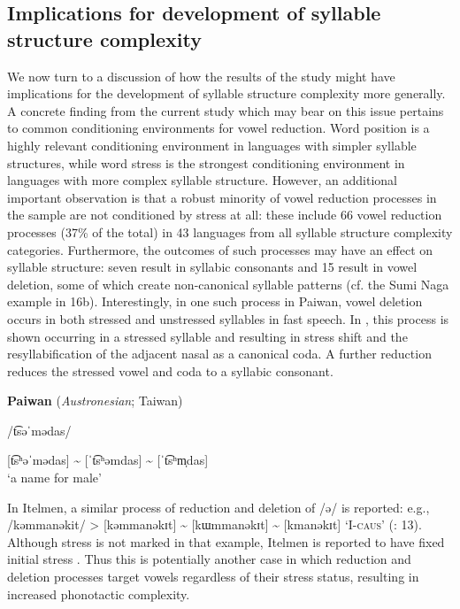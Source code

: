 \subsection{Implications for development of syllable structure complexity}\label{sec:6.4.2}

  We now turn to a discussion of how the results of the study might have implications for the development of syllable structure complexity more generally. A concrete finding from the current study which may bear on this issue pertains to common conditioning environments for vowel reduction. Word position is a highly relevant conditioning environment in languages with simpler syllable structures, while word stress is the strongest conditioning environment in languages with more complex syllable structure. However, an additional important observation is that a robust minority of vowel reduction processes in the sample are not conditioned by stress at all: these include 66 vowel reduction processes (37\% of the total) in 43 languages from all syllable structure complexity categories. Furthermore, the outcomes of such processes may have an effect on syllable structure: seven result in syllabic consonants and 15 result in vowel deletion, some of which create non-canonical syllable patterns (cf. the Sumi Naga example in 16b). Interestingly, in one such process in Paiwan, vowel deletion occurs in both stressed and unstressed syllables in fast speech. In , this process is shown occurring in a stressed syllable and resulting in stress shift and the resyllabification of the adjacent nasal as a canonical coda. A further reduction reduces the stressed vowel and coda to a syllabic consonant.

\ea\label{ex:6.21}
  \textbf{Paiwan} (\textit{Austronesian}; Taiwan)

/t͡səˈmədas/

[t͡sʰəˈmədas] {\textasciitilde} [ˈt͡sʰəmdas] {\textasciitilde} [ˈt͡sʰm̩das]\\
\glt ‘a name for male’
\citep[42]{Chang2006}
\z

In Itelmen, a similar process of reduction and deletion of /ə/ is reported: e.g., /kəmmanəkit/ > [kəmmanəkɪt] {\textasciitilde} [kɯmmanəkɪt] {\textasciitilde} [kmanəkɪt] ‘I-\textsc{caus}’ (\citealt{GeorgVolodin1999}: 13). Although stress is not marked in that example, Itelmen is reported to have fixed initial stress \citep[6]{Bobaljik2006}. Thus this is potentially another case in which reduction and deletion processes target vowels regardless of their stress status, resulting in increased phonotactic complexity. 

